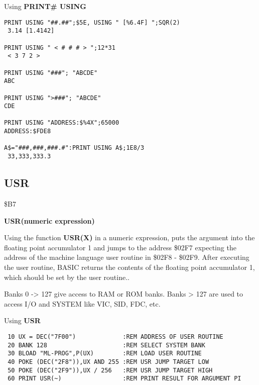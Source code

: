 \begin{description}[leftmargin=2cm,style=nextline]
\newpage
\item [Example:] Using {\bf PRINT\# USING}

\begin{tcolorbox}[colback=black,coltext=white]
\verbatimfont{\codefont}
\begin{verbatim}
PRINT USING "##.##";$5E, USING " [%
 3.14 [1.4142]

PRINT USING " < # # # > ";12*31
 < 3 7 2 >

PRINT USING "###"; "ABCDE"
ABC

PRINT USING ">###"; "ABCDE"
CDE

PRINT USING "ADDRESS:$%
ADDRESS:$FDE8

A$="###,###,###.#":PRINT USING A$;1E8/3
 33,333,333.3
\end{verbatim}
\end{tcolorbox}
\end{description}


\newpage
\subsection{USR}
\begin{description}[leftmargin=2cm,style=nextline]
\item [Token:] \$B7
\item [Format:] {\bf USR(numeric expression)}
\item [Usage:]  Using the function {\bf USR(X)} in a numeric
                expression, puts the argument into the
                floating point accumulator 1 and jumps to the
                address \$02F7 expecting the address of the
                machine language user routine in \$02F8 - \$02F9.
                After executing the user routine, BASIC returns
                the contents of the floating point accumulator 1,
                which should be set by the user routine..

\item [Remarks:] Banks 0 -> 127 give access to RAM or ROM banks.
                 Banks > 127 are used to access I/O and SYSTEM
                 like VIC, SID, FDC, etc.
\item [Example:] Using {\bf USR}

\begin{tcolorbox}[colback=black,coltext=white]
\verbatimfont{\codefont}
\begin{verbatim}
 10 UX = DEC("7F00")             :REM ADDRESS OF USER ROUTINE
 20 BANK 128                     :REM SELECT SYSTEM BANK
 30 BLOAD "ML-PROG",P(UX)        :REM LOAD USER ROUTINE
 40 POKE (DEC("2F8")),UX AND 255 :REM USR JUMP TARGET LOW
 50 POKE (DEC("2F9")),UX / 256   :REM USR JUMP TARGET HIGH
 60 PRINT USR(~)                 :REM PRINT RESULT FOR ARGUMENT PI
\end{verbatim}
\end{tcolorbox}
\end{description}

